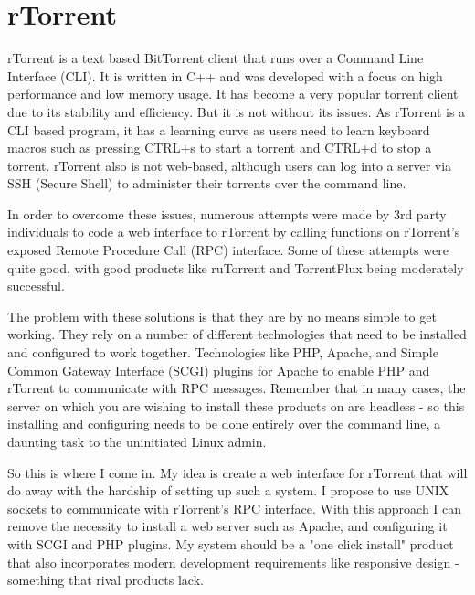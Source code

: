 
\section{rTorrent}
rTorrent\cite{rTorrent} is a text based BitTorrent client that runs over a Command Line Interface (CLI). It is written in C++ and was developed with a focus on high performance and low memory usage. It has become a very popular torrent client due to its stability and efficiency. But it is not without its issues. As rTorrent is a CLI based program, it has a learning curve as users need to learn keyboard macros such as pressing CTRL+s to start a torrent and CTRL+d to stop a torrent. rTorrent also is not web-based, although users can log into a server via SSH (Secure Shell) to administer their torrents over the command line. 

In order to overcome these issues, numerous attempts were made by 3rd party individuals to code a web interface to rTorrent by calling functions on rTorrent's exposed Remote Procedure Call (RPC) interface. Some of these attempts were quite good, with good products like ruTorrent\cite{ruTorrent} and TorrentFlux\cite{TorrentFlux} being moderately successful. 

The problem with these solutions is that they are by no means simple to get working. They rely on a number of different technologies that need to be installed and configured to work together. Technologies like PHP\cite{PHP}, Apache\cite{Apache}, and Simple Common Gateway Interface (SCGI) plugins for Apache\cite{SCGIplugin} to enable PHP and rTorrent to communicate with RPC messages. Remember that in many cases, the server on which you are wishing to install these products on are headless - so this installing and configuring needs to be done entirely over the command line, a daunting task to the uninitiated Linux admin. 

So this is where I come in. My idea is create a web interface for rTorrent that will do away with the hardship of setting up such a system. I propose to use UNIX sockets to communicate with rTorrent's RPC interface. With this approach I can remove the necessity to install a web server such as Apache, and configuring it with SCGI and PHP plugins. My system should be a "one click install" product that also incorporates modern development requirements like responsive design - something that rival products lack.













